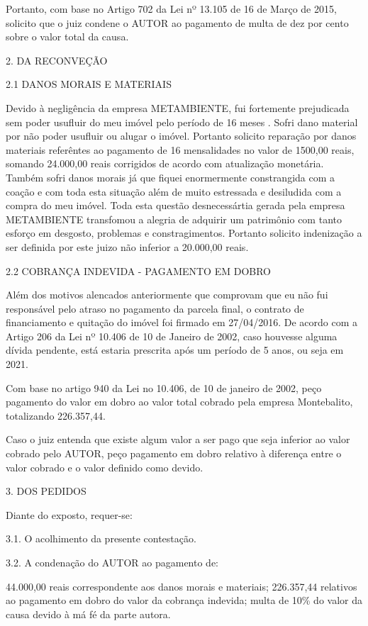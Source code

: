 \documentclass[11pt]{letter}
\begin{document}
Portanto, com base no Artigo 702 da Lei nº 13.105 de 16 de Março de 2015, solicito que o juiz condene o AUTOR ao pagamento de multa de dez por cento sobre o valor total da causa.

2. DA RECONVEÇÃO

2.1 DANOS MORAIS E MATERIAIS 
 
Devido à negligência da empresa METAMBIENTE, fui fortemente prejudicada sem poder usufluir do meu imóvel pelo período de 16 meses . Sofri dano material por não poder usufluir ou alugar o imóvel. Portanto solicito reparação por danos materiais referêntes ao pagamento de 16 mensalidades no valor de 1500,00 reais, somando 24.000,00 reais corrigidos de acordo com atualização monetária. Também sofri danos morais já que fiquei enormermente constrangida com a coação e com toda esta situação além de muito estressada e desiludida com a compra do meu imóvel. Toda esta questão desnecessártia gerada pela empresa METAMBIENTE transfomou a alegria de adquirir um patrimônio com tanto esforço em desgosto, problemas e constragimentos. Portanto solicito indenização a ser definida por este juizo não inferior a 20.000,00 reais. 

2.2 COBRANÇA INDEVIDA - PAGAMENTO EM DOBRO

Além dos motivos alencados anteriormente que comprovam que eu não fui responsável pelo atraso no pagamento da parcela final, o contrato de financiamento e quitação do imóvel foi firmado em 27/04/2016. De acordo com a Artigo 206 da Lei nº 10.406 de 10 de Janeiro de 2002, caso houvesse alguma dívida pendente, está estaria prescrita após um período de 5 anos, ou seja em 2021.

Com base no artigo 940 da Lei no 10.406, de 10 de janeiro de 2002, peço pagamento do valor em dobro ao valor total cobrado pela empresa Montebalito, totalizando 226.357,44.

Caso o juiz entenda que existe algum valor a ser pago que seja inferior ao valor cobrado pelo AUTOR, peço pagamento em dobro relativo à diferença entre o valor cobrado e o valor definido como devido. 

3. DOS PEDIDOS

Diante do exposto, requer-se:

3.1. O acolhimento da presente contestação.

3.2. A condenação do AUTOR ao pagamento de:

	44.000,00 reais correspondente aos danos morais e materiais;
	226.357,44 relativos ao pagamento em dobro do valor da cobrança indevida;
	multa de 10\% do valor da causa devido à má fé da parte autora.
	
\end{document}
